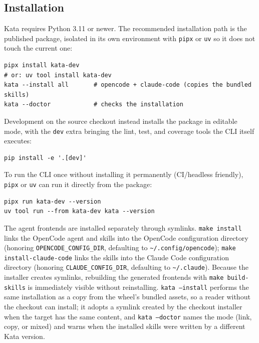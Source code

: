 \documentclass{sbc2019}%
\begin{document}
\subsection{Installation}

Kata requires Python 3.11 or newer. The recommended installation path is
the published package, isolated in its own environment with
\texttt{pipx} or \texttt{uv} so it does not touch the current one:

\begin{lstlisting}
pipx install kata-dev
# or: uv tool install kata-dev
kata --install all       # opencode + claude-code (copies the bundled skills)
kata --doctor            # checks the installation
\end{lstlisting}

Development on the source checkout instead installs the package in
editable mode, with the \texttt{dev} extra bringing the lint, test, and
coverage tools the CLI itself executes:

\begin{lstlisting}
pip install -e '.[dev]'
\end{lstlisting}

To run the CLI once without installing it permanently (CI/headless
friendly), \texttt{pipx} or \texttt{uv} can run it directly from the
package:

\begin{lstlisting}
pipx run kata-dev --version
uv tool run --from kata-dev kata --version
\end{lstlisting}

The agent frontends are installed separately through symlinks. \texttt{make
install} links the OpenCode agent and skills into the OpenCode
configuration directory (honoring \texttt{OPENCODE\_CONFIG\_DIR}, defaulting
to \texttt{\~{}/.config/opencode}); \texttt{make install-claude-code} links
the skills into the Claude Code configuration directory (honoring
\texttt{CLAUDE\_CONFIG\_DIR}, defaulting to \texttt{\~{}/.claude}).
Because the installer creates symlinks, rebuilding the generated frontends
with \texttt{make build-skills} is immediately visible without
reinstalling. \texttt{kata --install} performs the same installation as a
copy from the wheel's bundled assets, so a reader without the checkout can
install; it adopts a symlink created by the checkout installer when the
target has the same content, and \texttt{kata --doctor} names the mode
(link, copy, or mixed) and warns when the installed skills were written by a
different Kata version.
\end{document}
